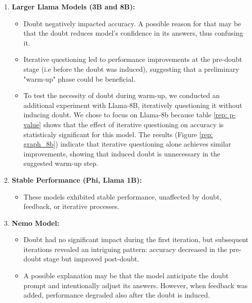 \begin{enumerate}
    \item \textbf{Larger Llama Models (3B and 8B):}
    \begin{itemize} 
        \item Doubt negatively impacted accuracy. A possible reason for that may be that the doubt reduces model's confidence in its answers, thus confusing it.
        \item Iterative questioning led to performance improvements at the pre-doubt stage (i.e before the doubt was induced), suggesting that a preliminary "warm-up" phase could be beneficial.
        \item To test the necessity of doubt during warm-up, we conducted an additional experiment with Llama-8B, iteratively questioning it without inducing doubt. We chose to focus on Llama-8b because table \ref{rep: p-value} shows that the effect of iterative questioning on accuracy is statisticaly significant for this model. The results (Figure \ref{rep: graph_8b}) indicate that iterative questioning alone achieves similar improvements, showing that induced doubt is unnecessary in the suggested warm-up step.
    \end{itemize} 
    \item \textbf{Stable Performance (Phi, Llama 1B):}
    \begin{itemize} 
        \item These models exhibited stable performance, unaffected by doubt, feedback, or iterative processes.
    \end{itemize} 
    \item \textbf{Nemo Model:}
    \begin{itemize} 
        \item Doubt had no significant impact during the first iteration, but subsequent iterations revealed an intriguing pattern: accuracy decreased in the pre-doubt stage but improved post-doubt.
        \item A possible explanation may be that the model anticipate the doubt prompt and intentionally adjust its answers. However, when feedback was added, performance degraded also after the doubt is induced.
    \end{itemize}
\end{enumerate}
